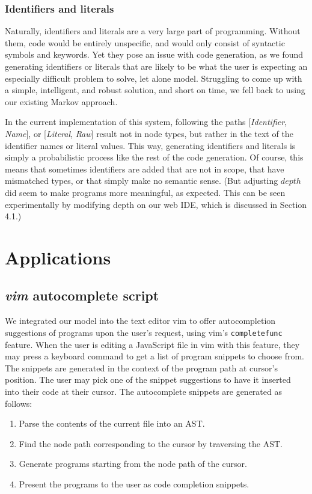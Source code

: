 \documentclass{article}
\begin{document}
\subsubsection{Identifiers and literals}

Naturally, identifiers and literals are a very large part of programming. Without them, code would be entirely unspecific, and would only consist of syntactic symbols and keywords. Yet they pose an issue with code generation, as we found generating identifiers or literals that are likely to be what the user is expecting an especially difficult problem to solve, let alone model. Struggling to come up with a simple, intelligent, and robust solution, and short on time, we fell back to using our existing Markov approach.

In the current implementation of this system, following the paths [\emph{Identifier}, \emph{Name}], or [\emph{Literal}, \emph{Raw}] result not in node types, but rather in the text of the identifier names or literal values. This way, generating identifiers and literals is simply a probabilistic process like the rest of the code generation. Of course, this means that sometimes identifiers are added that are not in scope, that have mismatched types, or that simply make no semantic sense. (But adjusting $depth$ did seem to make programs more meaningful, as expected. This can be seen experimentally by modifying depth on our web IDE, which is discussed in Section 4.1.)

%

\section{Applications}

\subsection{\emph{vim} autocomplete script}

We integrated our model into the text editor vim to offer autocompletion
suggestions of programs upon the user's request, using vim's
\texttt{completefunc} feature. When the user is editing a JavaScript file in vim with
this feature, they may press a keyboard command to get a list of program
snippets to choose from. The snippets are generated in the context of the
program path at cursor's position. The user may pick one of the snippet
suggestions to have it inserted into their code at their cursor. The autocomplete snippets are generated as follows:
\begin{enumerate}
	\item Parse the contents of the current file into an AST.
	\item Find the node path corresponding to the cursor by traversing the AST.
	\item Generate programs starting from the node path of the cursor.
	\item Present the programs to the user as code completion snippets.
\end{enumerate}
\end{document}
